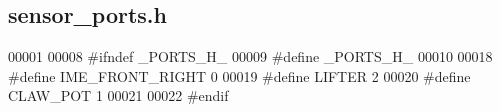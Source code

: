 \subsection{sensor\+\_\+ports.\+h}
\label{a00062_source}

\begin{DoxyCode}
00001 
00008 \textcolor{preprocessor}{#ifndef \_PORTS\_H\_}
00009 \textcolor{preprocessor}{#define \_PORTS\_H\_}
00010 
00018 \textcolor{preprocessor}{#define IME\_FRONT\_RIGHT 0}
00019 \textcolor{preprocessor}{#define LIFTER 2}
00020 \textcolor{preprocessor}{#define CLAW\_POT 1}
00021 
00022 \textcolor{preprocessor}{#endif}
\end{DoxyCode}

